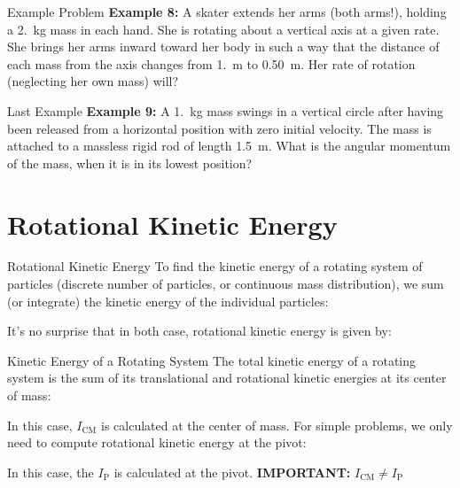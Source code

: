 \documentclass[12pt,compress,aspectratio=169]{beamer}
\newcommand{\eq}[2]{\vspace{#1}{\Large\begin{displaymath}#2\end{displaymath}}}
\begin{document}
\begin{frame}{Example Problem}
  \textbf{Example 8:} A skater extends her arms (both arms!), holding a
  \SI{2.}{\kilo\gram} mass in each hand. She is rotating about a vertical axis
  at a given rate. She brings her arms inward toward her body in such a way that
  the distance of each mass from the axis changes from \SI{1.}{\metre} to
  \SI{.50}{\metre}. Her rate of rotation (neglecting her own mass) will?
\end{frame}



\begin{frame}{Last Example}
  \textbf{Example 9:} A \SI{1.}{\kilo\gram} mass swings in a vertical circle
  after having been released from a horizontal position with zero initial
  velocity. The mass is attached to a massless rigid rod of length
  \SI{1.5}{\metre}. What is the angular momentum of the mass, when it is in its
  lowest position?
\end{frame}


\section{Rotational Kinetic Energy}

\begin{frame}{Rotational Kinetic Energy}
  To find the kinetic energy of a rotating system of particles (discrete number
  of particles, or continuous mass distribution), we sum (or integrate) the
  kinetic energy of the individual particles:
    
  
  It's no surprise that in both case, rotational kinetic energy is given by:
  
  \eq{-.25in}{
    \boxed{K=\frac{1}{2}I\omega^2}
  }
\end{frame}



\begin{frame}{Kinetic Energy of a Rotating System}
  The total kinetic energy of a rotating system is the sum of its translational
  and rotational kinetic energies at its center of mass:

  \eq{-.2in}{
    \boxed{K=\frac{1}{2}mv_\mathrm{CM}^2+\frac{1}{2}I_\mathrm{CM}\omega^2}
  }
  
  In this case, $I_\mathrm{CM}$ is calculated at the center of
  mass. For simple problems, we only need to compute rotational kinetic energy
  at the pivot:

  \eq{-.2in}{
    \boxed{K=\frac{1}{2}I_\mathrm{P}\omega^2}
  }
  
  In this case, the $I_\mathrm{P}$ is calculated at the pivot.
  \textbf{IMPORTANT:} $I_\mathrm{CM}\neq I_\mathrm{P}$
\end{frame}
\end{document}
